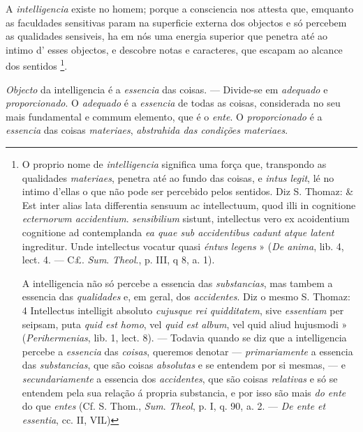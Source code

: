 A \emph{intelligencia} existe no homem; porque a consciencia nos attesta que, emquanto as faculdades sensitivas param na superficie externa dos objectos e só percebem as qualidades sensiveis, ha em nós uma energia superior que penetra até ao intimo d' esses objectos, e descobre notas e caracteres, que escapam ao alcance dos sentidos \footnote{O proprio nome de \emph{intelligencia} significa uma força que, transpondo as qualidades \emph{materiaes}, penetra até ao fundo das coisas, e \emph{intus legit}, lé no intimo d'ellas o que não pode ser percebido pelos sentidos. Diz S. Thomaz: \& Est inter alias lata differentia sensuum ac intellectuum, quod illi in cognitione \emph{ecternorwm accidentium}. \emph{sensibilium} sistunt, intellectus vero ex acoidentium cognitione ad contemplanda \emph{ea quae sub accidentibus cadunt atque latent} ingreditur. Unde intellectus vocatur quasi \emph{éntws legens} » (\emph{De anima}, lib. 4, lect. 4. --- C£. \emph{Sum}. \emph{Theol}., p. III, q 8, a. 1).\par A intelligencia não só percebe a essencia das \emph{substancias}, mas tambem a essencia das \emph{qualidades} e, em geral, dos \emph{accidentes}. Diz o mesmo S. Thomaz: 4 Intellectus intelligit absoluto \emph{cujusque rei quidditatem}, sive \emph{essentiam} per seipsam, puta \emph{quid est homo}, vel \emph{quid est album}, vel quid aliud hujusmodi » (\emph{Perihermenias}, lib. 1, lect. 8). --- Todavia quando se diz que a intelligencia percebe a \emph{essencia} das \emph{coisas}, queremos denotar --- \emph{primariamente} a essencia das \emph{substancias}, que são coisas \emph{absolutas} e se entendem por si mesmas, --- e \emph{secundariamente} a essencia dos \emph{accidentes}, que são coisas \emph{relativas} e só se entendem pela sua relação á propria substancia, e por isso são mais \emph{do ente} do que \emph{entes} (Cf. S. Thom., \emph{Sum}. \emph{Theol}, p. I, q. 90, a. 2. --- \emph{De ente et essentia}, cc. II, VIL)}.


\emph{Objecto} da intelligencia é a \emph{essencia} das coisas. --- Divide-se em \emph{adequado} e \emph{proporcionado}. O \emph{adequado} é a \emph{essencia} de todas as coisas, considerada no seu mais fundamental e commum elemento, que é o \emph{ente}. O \emph{proporcionado} é a \emph{essencia} das coisas \emph{materiaes}, \emph{abstrahida das condições materiaes}.

